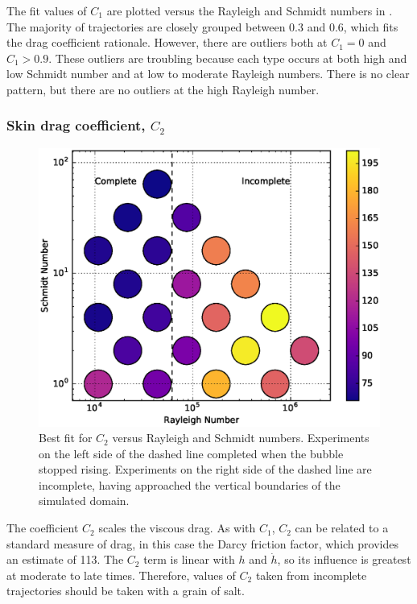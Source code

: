 The fit values of $C_1$ are plotted versus the Rayleigh and Schmidt numbers in .
The majority of trajectories are closely grouped between $0.3$ and $0.6$, which fits the drag coefficient rationale.
However, there are outliers both at $C_1 = 0$ and $C_1 > 0.9$.
These outliers are troubling because each type occurs at both high and low Schmidt number and at low to moderate Rayleigh numbers.
There is no clear pattern, but there are no outliers at the high Rayleigh number.

\subsubsection{Skin drag coefficient, $C_2$}
\begin{figure}
\includegraphics[width=\columnwidth]{figs/C2-vs-Rayleigh-Schmidt}
\caption{ 
  Best fit for $C_2$ versus Rayleigh and Schmidt numbers.
  Experiments on the left side of the dashed line completed when the bubble stopped rising.
  Experiments on the right side of the dashed line are incomplete, having approached the vertical boundaries of the simulated domain.
}
\end{figure}

The coefficient $C_2$ scales the viscous drag.
As with $C_1$, $C_2$ can be related to a standard measure of drag, in this case the Darcy friction factor, which provides an estimate of 113.
The $C_2$ term is linear with $h$ and $\dot{h}$, so its influence is greatest at moderate to late times.
Therefore, values of $C_2$ taken from incomplete trajectories should be taken with a grain of salt.

